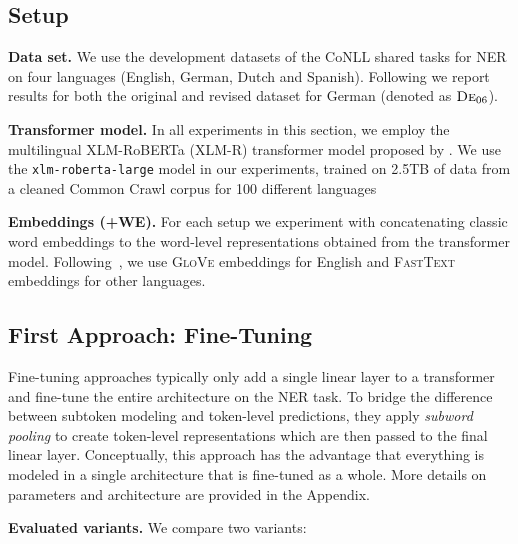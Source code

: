 \documentclass[11pt,a4paper]{article}
\begin{document}
\subsection{Setup}

\noindent
\textbf{Data set.} We use the development datasets of the CoNLL shared tasks \citep{tjong-kim-sang-de-meulder-2003-introduction,tjong-kim-sang-2002-introduction} for NER on four languages (English, German, Dutch and Spanish). Following \citet{yu-etal-2020-named} we report results for both the original and revised dataset for German (denoted as $\textsc{De}_{06}$).

\noindent
\textbf{Transformer model.}
In all experiments in this section, we employ the multilingual XLM-RoBERTa (XLM-R) transformer model proposed by \citet{conneau2019unsupervised}. We use the \texttt{xlm-roberta-large} model in our experiments, trained on 2.5TB of data from a cleaned Common Crawl corpus \cite{wenzek-etal-2020-ccnet} for 100 different languages



\noindent
\textbf{Embeddings (+WE).}
For each setup we experiment with concatenating classic word embeddings to the word-level representations obtained from the transformer model. Following~\citet{akbik-etal-2018-contextual}, we use \textsc{GloVe} embeddings \citep{pennington-etal-2014-glove} for English and \textsc{FastText} embeddings \citep{bojanowski-etal-2017-enriching} for other languages.






\subsection{First Approach: Fine-Tuning}
\label{sec:fine_tuning}
\vspace{-1mm}

Fine-tuning approaches typically only add a single linear layer to a transformer and fine-tune the entire architecture on the NER task. To bridge the difference between subtoken modeling and token-level predictions, they apply \textit{subword pooling} to create token-level representations which are then passed to the final linear layer. Conceptually, this approach has the advantage that everything is modeled in a single architecture that is fine-tuned as a whole. More details on parameters and architecture are provided in the Appendix. 



\noindent 
\textbf{Evaluated variants.} 
We compare two variants: 
\end{document}
